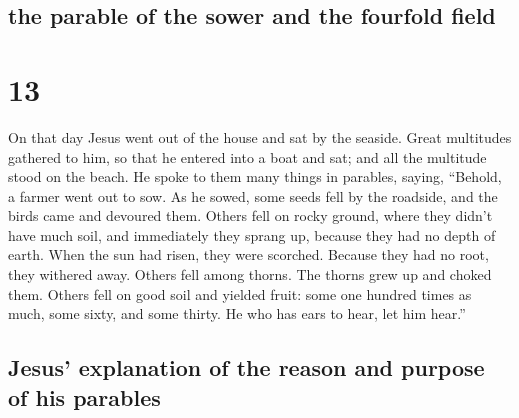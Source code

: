 \begin{paracol}{2}
\begin{otherlanguage}{english}
\hypertarget{the-parable-of-the-sower-and-the-fourfold-field}{%
\subsection{the parable of the sower and the fourfold
field}\label{the-parable-of-the-sower-and-the-fourfold-field}}

\hypertarget{section-25}{%
\section{13}\label{section-25}}

 On that day Jesus went out of the house and sat by the
seaside.  Great multitudes gathered to him, so that he
entered into a boat and sat; and all the multitude stood on the beach.
 He spoke to them many things in parables, saying,
``Behold, a farmer went out to sow.  As he sowed, some
seeds fell by the roadside, and the birds came and devoured them.
 Others fell on rocky ground, where they didn't have much
soil, and immediately they sprang up, because they had no depth of
earth.  When the sun had risen, they were scorched.
Because they had no root, they withered away.  Others fell
among thorns. The thorns grew up and choked them.  Others
fell on good soil and yielded fruit: some one hundred times as much,
some sixty, and some thirty.  He who has ears to hear, let
him hear.''

\hypertarget{jesus-explanation-of-the-reason-and-purpose-of-his-parables}{%
\subsection{Jesus' explanation of the reason and purpose of his
parables}\label{jesus-explanation-of-the-reason-and-purpose-of-his-parables}}


\end{otherlanguage}
\end{paracol}
